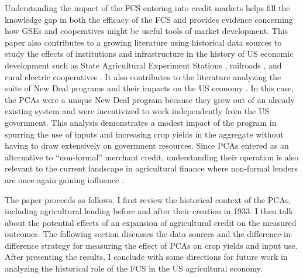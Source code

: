 \documentclass[12pt]{article}
\begin{document}
Understanding the impact of the FCS entering into credit markets helps fill the knowledge gap in both the efficacy of the FCS and provides evidence concerning how GSEs and cooperatives might be useful tools of market development.
This paper also contributes to a growing literature using historical data sources to study the effects of institutions and infrastructure in the history of US economic development such as State Agricultural Experiment Stations \citep{kantor_research_2019}, railroads \citep{donaldson2016railroads}, and rural electric cooperatives \citep{kitchens2015flip,lewis2020short}.
It also contributes to the literature analyzing the suite of New Deal programs and their impacts on the US economy \citep{fishback_can_2003,cullen_did_2006}.
In this case, the PCAs were a unique New Deal program because they grew out of an already existing system and were incentivized to work independently from the US government.
This analysis demonstrates a modest impact of the program in spurring the use of inputs and increasing crop yields in the aggregate without having to draw extensively on government resources.
Since PCAs entered as an alternative to ``non-formal'' merchant credit, understanding their operation is also relevant to the current landscape in agricultural finance where non-formal lenders are once again gaining influence \citep{brewer_farmers_2019,fiechter_what_2020,stevens2021nontraditional}.

The paper proceeds as follows.
I first review the historical context of the PCAs, including agricultural lending before and after their creation in 1933.
I then talk about the potential effects of an expansion of agricultural credit on the measured outcomes.
The following section discusses the data sources and the difference-in-difference strategy for measuring the effect of PCAs on crop yields and input use.
After presenting the results, I conclude with some directions for future work in analyzing the historical role of the FCS in the US agricultural economy.
\end{document}
